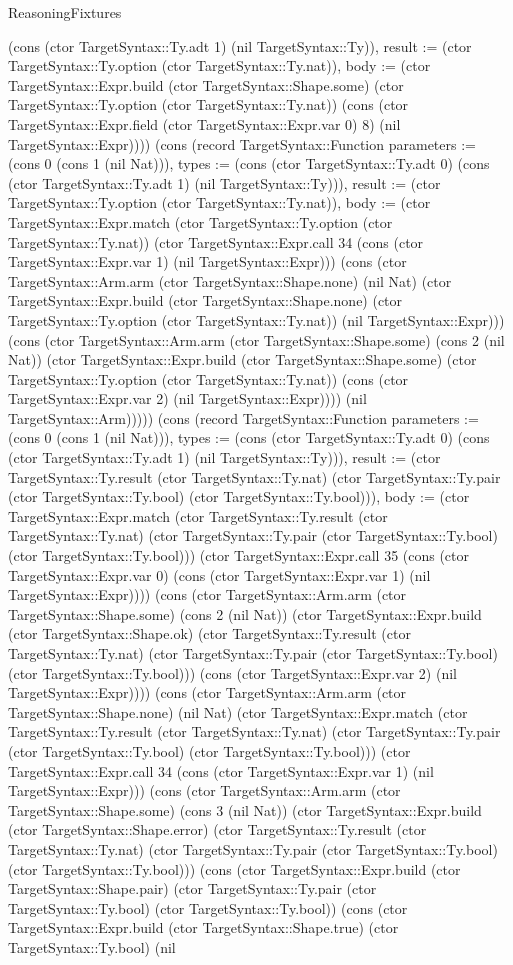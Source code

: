 \begin{lexlean}{ReasoningFixtures}
\begin{semanticmodule}
{(cons (ctor TargetSyntax::Ty.adt 1) (nil TargetSyntax::Ty)), result := (ctor TargetSyntax::Ty.option (ctor TargetSyntax::Ty.nat)), body := (ctor TargetSyntax::Expr.build (ctor TargetSyntax::Shape.some) (ctor TargetSyntax::Ty.option (ctor TargetSyntax::Ty.nat)) (cons (ctor TargetSyntax::Expr.field (ctor TargetSyntax::Expr.var 0) 8) (nil TargetSyntax::Expr)))}) (cons (record TargetSyntax::Function {parameters := (cons 0 (cons 1 (nil Nat))), types := (cons (ctor TargetSyntax::Ty.adt 0) (cons (ctor TargetSyntax::Ty.adt 1) (nil TargetSyntax::Ty))), result := (ctor TargetSyntax::Ty.option (ctor TargetSyntax::Ty.nat)), body := (ctor TargetSyntax::Expr.match (ctor TargetSyntax::Ty.option (ctor TargetSyntax::Ty.nat)) (ctor TargetSyntax::Expr.call 34 (cons (ctor TargetSyntax::Expr.var 1) (nil TargetSyntax::Expr))) (cons (ctor TargetSyntax::Arm.arm (ctor TargetSyntax::Shape.none) (nil Nat) (ctor TargetSyntax::Expr.build (ctor TargetSyntax::Shape.none) (ctor TargetSyntax::Ty.option (ctor TargetSyntax::Ty.nat)) (nil TargetSyntax::Expr))) (cons (ctor TargetSyntax::Arm.arm (ctor TargetSyntax::Shape.some) (cons 2 (nil Nat)) (ctor TargetSyntax::Expr.build (ctor TargetSyntax::Shape.some) (ctor TargetSyntax::Ty.option (ctor TargetSyntax::Ty.nat)) (cons (ctor TargetSyntax::Expr.var 2) (nil TargetSyntax::Expr)))) (nil TargetSyntax::Arm))))}) (cons (record TargetSyntax::Function {parameters := (cons 0 (cons 1 (nil Nat))), types := (cons (ctor TargetSyntax::Ty.adt 0) (cons (ctor TargetSyntax::Ty.adt 1) (nil TargetSyntax::Ty))), result := (ctor TargetSyntax::Ty.result (ctor TargetSyntax::Ty.nat) (ctor TargetSyntax::Ty.pair (ctor TargetSyntax::Ty.bool) (ctor TargetSyntax::Ty.bool))), body := (ctor TargetSyntax::Expr.match (ctor TargetSyntax::Ty.result (ctor TargetSyntax::Ty.nat) (ctor TargetSyntax::Ty.pair (ctor TargetSyntax::Ty.bool) (ctor TargetSyntax::Ty.bool))) (ctor TargetSyntax::Expr.call 35 (cons (ctor TargetSyntax::Expr.var 0) (cons (ctor TargetSyntax::Expr.var 1) (nil TargetSyntax::Expr)))) (cons (ctor TargetSyntax::Arm.arm (ctor TargetSyntax::Shape.some) (cons 2 (nil Nat)) (ctor TargetSyntax::Expr.build (ctor TargetSyntax::Shape.ok) (ctor TargetSyntax::Ty.result (ctor TargetSyntax::Ty.nat) (ctor TargetSyntax::Ty.pair (ctor TargetSyntax::Ty.bool) (ctor TargetSyntax::Ty.bool))) (cons (ctor TargetSyntax::Expr.var 2) (nil TargetSyntax::Expr)))) (cons (ctor TargetSyntax::Arm.arm (ctor TargetSyntax::Shape.none) (nil Nat) (ctor TargetSyntax::Expr.match (ctor TargetSyntax::Ty.result (ctor TargetSyntax::Ty.nat) (ctor TargetSyntax::Ty.pair (ctor TargetSyntax::Ty.bool) (ctor TargetSyntax::Ty.bool))) (ctor TargetSyntax::Expr.call 34 (cons (ctor TargetSyntax::Expr.var 1) (nil TargetSyntax::Expr))) (cons (ctor TargetSyntax::Arm.arm (ctor TargetSyntax::Shape.some) (cons 3 (nil Nat)) (ctor TargetSyntax::Expr.build (ctor TargetSyntax::Shape.error) (ctor TargetSyntax::Ty.result (ctor TargetSyntax::Ty.nat) (ctor TargetSyntax::Ty.pair (ctor TargetSyntax::Ty.bool) (ctor TargetSyntax::Ty.bool))) (cons (ctor TargetSyntax::Expr.build (ctor TargetSyntax::Shape.pair) (ctor TargetSyntax::Ty.pair (ctor TargetSyntax::Ty.bool) (ctor TargetSyntax::Ty.bool)) (cons (ctor TargetSyntax::Expr.build (ctor TargetSyntax::Shape.true) (ctor TargetSyntax::Ty.bool) (nil }
\end{semanticmodule}
\end{lexlean}
